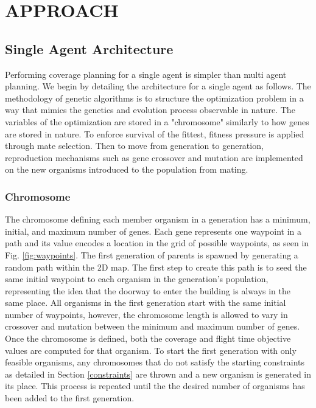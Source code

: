 \documentclass[letterpaper, 10 pt, conference]{ieeeconf}  %
\begin{document}
\section{APPROACH}\label{approach}
\subsection{Single Agent Architecture}

Performing coverage planning for a single agent is simpler than multi agent planning. We begin by detailing the architecture for a single agent as follows. The methodology of genetic algorithms is to structure the optimization problem in a way that mimics the genetics and evolution process observable in nature. The variables of the optimization are stored in a "chromosome" similarly to how genes are stored in nature. To enforce survival of the fittest, fitness pressure is applied through mate selection. Then to move from generation to generation, reproduction mechanisms such as gene crossover and mutation are implemented on the new organisms introduced to the population from mating.

\subsubsection{Chromosome}

The chromosome defining each member organism in a generation has a minimum, initial, and maximum number of genes. Each gene represents one waypoint in a path and its value encodes a location in the grid of possible waypoints, as seen in Fig. \ref{fig:waypoints}. The first generation of parents is spawned by generating a random path within the 2D map. The first step to create this path is to seed the same initial waypoint to each organism in the generation's population, representing the idea that the doorway to enter the building is always in the same place. All organisms in the first generation start with the same initial number of waypoints, however, the chromosome length is allowed to vary in crossover and mutation between the minimum and maximum number of genes. Once the chromosome is defined, both the coverage and flight time objective values are computed for that organism. To start the first generation with only feasible organisms, any chromosomes that do not satisfy the starting constraints as detailed in Section \ref{constraints} are thrown and a new organism is generated in its place. This process is repeated until the the desired number of organisms has been added to the first generation.
\end{document}
